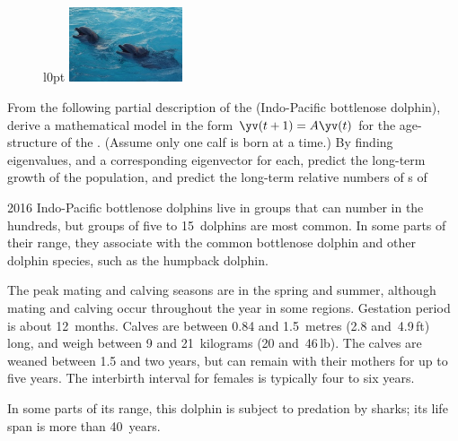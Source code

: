 \begin{exercise}  
\begin{figure}l{0pt}
\includegraphics[width=9em]{EigGen/dolphins}
\end{figure}
From the following partial description of the  (Indo-Pacific bottlenose dolphin), 
derive a mathematical model in the form \(\yv(t+1)=A\yv(t)\) for the age-structure of the .
(Assume only one calf is born at a time.)
By finding eigenvalues, and a corresponding eigenvector for each, predict the long-term growth of the population, and predict the long-term relative numbers of s of 

\begin{quoted}{ 2016 \cite[pp.~362--5]{Reeves2002}}
Indo-Pacific bottlenose dolphins live in groups that can number in the hundreds, but groups of five to 15~dolphins are most common.  In some parts of their range, they associate with the common bottlenose dolphin and other dolphin species, such as the humpback dolphin.

The peak mating and calving seasons are in the spring and summer, although mating and calving occur throughout the year in some regions. Gestation period is about 12~months. Calves are between 0.84 and 1.5~metres (2.8 and~4.9\,ft) long, and weigh between 9 and 21~kilograms (20 and~46\,lb). The calves are weaned between 1.5 and two years, but can remain with their mothers for up to five years. The interbirth interval for females is typically four to six years.

In some parts of its range, this dolphin is subject to predation by sharks; its life span is more than 40~years.
\end{quoted}
\end{exercise}






